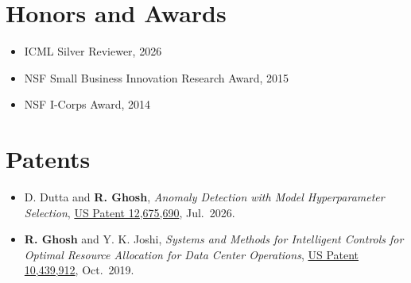 \documentclass[10.5pt]{article}
\begin{document}
\section{Honors and Awards}
\begin{itemize}
  \item ICML Silver Reviewer, 2026
  \item NSF Small Business Innovation Research Award, 2015
  \item NSF I-Corps Award, 2014
\end{itemize}

\section{Patents}
\begin{itemize}
  \item D. Dutta and \textbf{R. Ghosh}, \textit{Anomaly Detection with Model Hyperparameter Selection}, \href{https://image-ppubs.uspto.gov/dirsearch-public/print/downloadPdf/12675690}{US Patent 12,675,690}, Jul.\ 2026.
  \item \textbf{R. Ghosh} and Y. K. Joshi, \textit{Systems and Methods for Intelligent Controls for Optimal Resource Allocation for Data Center Operations}, \href{https://patents.google.com/patent/US10439912B2/en}{US Patent 10,439,912}, Oct.\ 2019.
\end{itemize}
\end{document}

